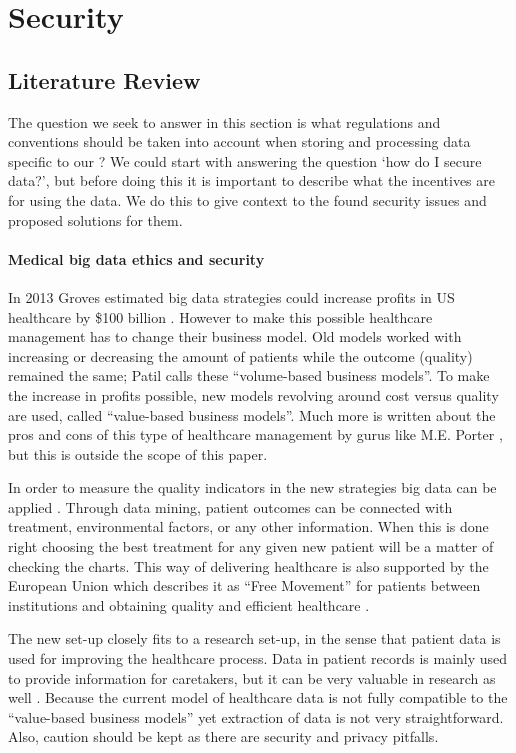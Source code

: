\section{Security}
\subsection{Literature Review}
\label{security-literature}

The question we seek to answer in this section is what regulations and conventions should be taken into account when storing and processing data specific to our \ivfsystem{}?
We could start with answering the question `how do I secure data?', but before doing this it is important to describe what the incentives are for using the data.
We do this to give context to the found security issues and proposed solutions for them.

\paragraph{Medical big data ethics and security}
\label{security-ethics}

In 2013 Groves \cite{s20Groves2013} estimated big data strategies could increase profits in US healthcare by \$100 billion \cite{s13Patil2014}.
However to make this possible healthcare management has to change their business model.
Old models worked with increasing or decreasing the amount of patients while the outcome (quality) remained the same; Patil \cite{s13Patil2014} calls these ``volume-based business models''.
To make the increase in profits possible, new models revolving around cost versus quality are used, called ``value-based business models''.
Much more is written about the pros and cons of this type of healthcare management by gurus like M.E. Porter \cite{s21Porter2006}, but this is outside the scope of this paper.

In order to measure the quality indicators in the new strategies big data can be applied \cite{s6West2009}. 
Through data mining, patient outcomes can be connected with treatment, environmental factors, or any other information.
When this is done right choosing the best treatment for any given new patient will be a matter of checking the charts.
This way of delivering healthcare is also supported by the European Union which describes it as ``Free Movement'' for patients between institutions and obtaining quality and efficient healthcare \cite{s8FernandezAleman2013}.

The new set-up closely fits to a research set-up, in the sense that patient data is used for improving the healthcare process.
Data in patient records is mainly used to provide information for caretakers, but it can be very valuable in research as well \cite{s15Fenz2014}.
Because the current model of healthcare data is not fully compatible to the ``value-based business models'' yet extraction of data is not very straightforward.
Also, caution should be kept as there are security and privacy pitfalls.

